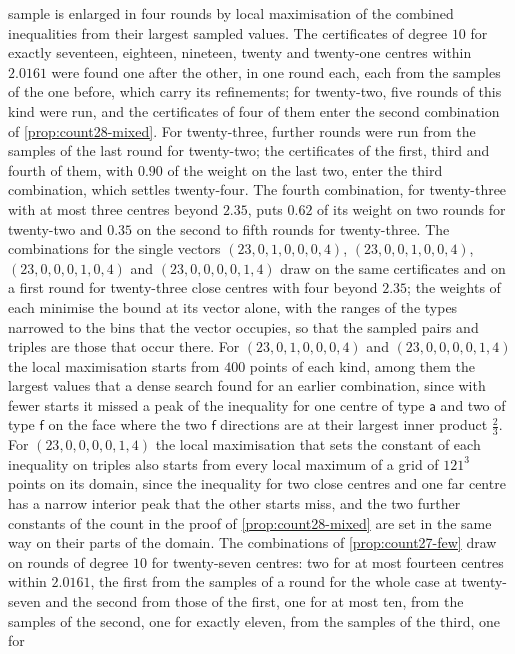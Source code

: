 \documentclass[11pt,reqno]{amsart}
\renewcommand{\_}{\origunderscore\allowbreak}
\numberwithin{equation}{section}
\theoremstyle{plain}
\theoremstyle{definition}
\theoremstyle{remark}
\begin{document}
sample is enlarged in four rounds by local maximisation of the combined
inequalities from their largest sampled values. The certificates of degree
$10$ for exactly seventeen, eighteen, nineteen, twenty and twenty-one centres within $2.0161$ were found one
after the other, in one round each, each from the samples of the one
before, which carry its refinements;
for twenty-two, five rounds of this kind were run, and the
certificates of four of them enter the second combination of
\cref{prop:count28-mixed}. For twenty-three, further rounds were run from the
samples of the last round for twenty-two; the certificates of the first,
third and fourth of them, with $0.90$ of the weight on the last two, enter the
third combination, which settles twenty-four. The fourth combination, for
twenty-three with at most three centres beyond $2.35$, puts $0.62$ of its
weight on two rounds for twenty-two and $0.35$ on the second to fifth rounds
for twenty-three. The combinations for the single vectors $(23,0,1,0,0,0,4)$,
$(23,0,0,1,0,0,4)$, $(23,0,0,0,1,0,4)$ and $(23,0,0,0,0,1,4)$ draw on the same certificates and
on a first round for twenty-three close centres with four beyond $2.35$; the
weights of each minimise the bound at its vector alone, with the ranges of
the types narrowed to the bins that the vector occupies, so that the sampled
pairs and triples are those that occur there. For $(23,0,1,0,0,0,4)$ and
$(23,0,0,0,0,1,4)$ the
local maximisation starts from $400$ points of each kind, among them the
largest values that a dense search found for an earlier combination, since
with fewer starts it missed a peak of the inequality for one centre of type
$\mathsf a$ and two of type $\mathsf f$ on the face where the two
$\mathsf f$ directions are at their largest inner product $\frac23$.
For $(23,0,0,0,0,1,4)$ the local maximisation that sets the constant of
each inequality on triples also starts from every local maximum of a grid
of $121^3$ points on its domain, since the inequality for two close centres
and one far centre has a narrow interior peak that the other starts miss,
and the two further constants of the count in the proof of
\cref{prop:count28-mixed} are set in the same way on their parts of the
domain.
The combinations of \cref{prop:count27-few} draw on rounds of degree $10$ for
twenty-seven centres: two for at most fourteen centres within $2.0161$, the
first from the samples of a round for the whole case at twenty-seven and the
second from those of the first, one for at most ten, from the samples of
the second, one for exactly eleven, from the samples of the third, one for
\end{document}
